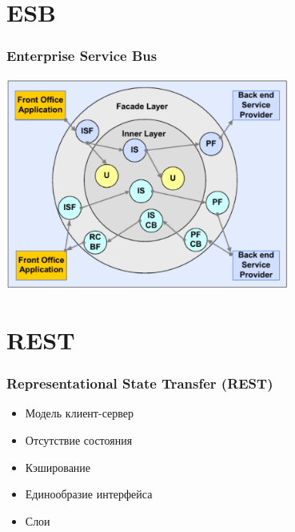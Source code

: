 \documentclass[xetex,mathserif,serif]{beamer}
\begin{document}
	\section{ESB}

	\begin{frame}
		\frametitle{Enterprise Service Bus}
		\begin{center}
			\includegraphics[width=0.7\textwidth]{esb.png}
		\end{center}
	\end{frame}

	\section{REST}

	\begin{frame}
		\frametitle{Representational State Transfer (REST)}
		\begin{itemize}
			\item Модель клиент-сервер
			\item Отсутствие состояния
			\item Кэширование
			\item Единообразие интерфейса
			\item Слои
		\end{itemize}
	\end{frame}
\end{document}
